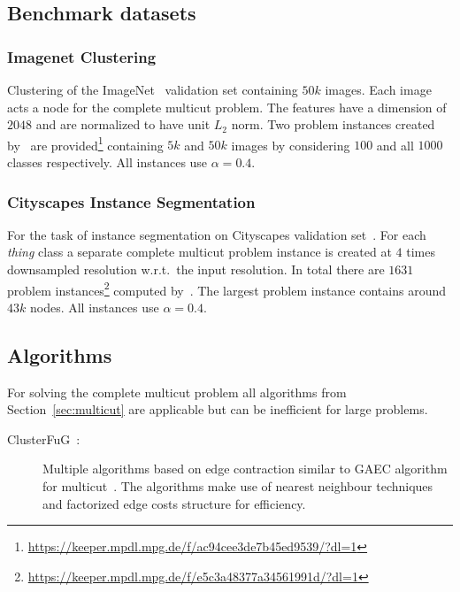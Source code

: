 \subsection{Benchmark datasets}

\subsubsection{Imagenet Clustering}
Clustering of the ImageNet~\cite{deng2009imagenet} validation set containing $50k$ images. Each image acts a node for the complete multicut problem. The features have a dimension of $2048$ and are normalized to have unit $L_2$ norm. Two problem instances created by~\cite{aabbas23_clusterfug} are provided\footnote{\url{https://keeper.mpdl.mpg.de/f/ac94cee3de7b45ed9539/?dl=1}} containing $5k$ and $50k$ images by considering $100$ and all $1000$ classes respectively. All instances use $\alpha = 0.4$.

\subsubsection{Cityscapes Instance Segmentation}
For the task of instance segmentation on Cityscapes validation set~\cite{cordts2016cityscapes}. For each \textit{thing} class a separate complete multicut problem instance is created at $4$ times downsampled resolution w.r.t.\ the input resolution. 
In total there are $1631$ problem instances\footnote{\url{https://keeper.mpdl.mpg.de/f/e5c3a48377a34561991d/?dl=1}} computed by~\cite{aabbas23_clusterfug}. The largest problem instance contains around $43k$ nodes. All instances use $\alpha = 0.4$.
\subsection{Algorithms}
For solving the complete multicut problem all algorithms from Section~\ref{sec:multicut} are applicable but can be inefficient for large problems. 
\begin{description}
\item[ClusterFuG~\cite{aabbas23_clusterfug}:] Multiple algorithms based on edge contraction similar to GAEC algorithm for multicut~\cite{keuper2015efficient}. The algorithms make use of nearest neighbour techniques and factorized edge costs structure for efficiency.
\end{description}
